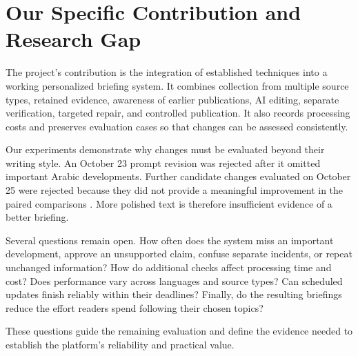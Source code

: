 \section{Our Specific Contribution and Research Gap}

The project's contribution is the integration of established techniques into a working personalized briefing system. It combines collection from multiple source types, retained evidence, awareness of earlier publications, AI editing, separate verification, targeted repair, and controlled publication. It also records processing costs and preserves evaluation cases so that changes can be assessed consistently.

Our experiments demonstrate why changes must be evaluated beyond their writing style. An October 23 prompt revision was rejected after it omitted important Arabic developments. Further candidate changes evaluated on October 25 were rejected because they did not provide a meaningful improvement in the paired comparisons \cite{notificationeval,continuity}. More polished text is therefore insufficient evidence of a better briefing.

Several questions remain open. How often does the system miss an important development, approve an unsupported claim, confuse separate incidents, or repeat unchanged information? How do additional checks affect processing time and cost? Does performance vary across languages and source types? Can scheduled updates finish reliably within their deadlines? Finally, do the resulting briefings reduce the effort readers spend following their chosen topics?

These questions guide the remaining evaluation and define the evidence needed to establish the platform's reliability and practical value.